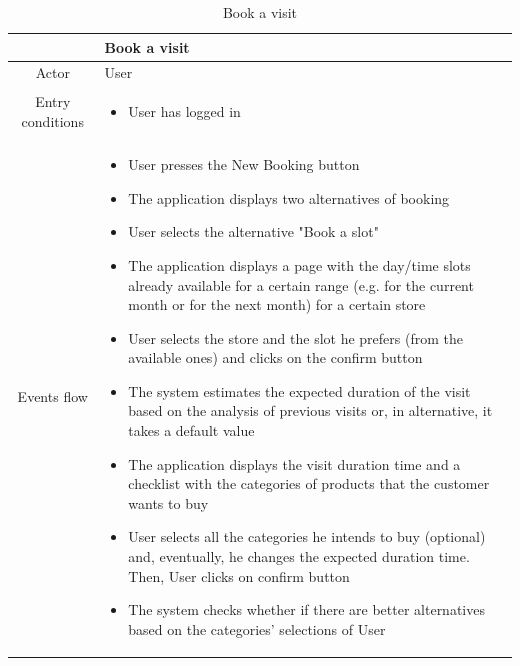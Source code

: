 \documentclass[table, 12pt]{article}
\begin{document}
\begin{longtable}{|c| p{10cm}|}
    \caption{Book a visit}                                                                                                                                          \\
    \hline
                     & Book a visit                                                                                                                                 \\
    \hline
    Actor            & User                                                                                                                                         \\
    \hline
    Entry conditions & \begin{itemize}
        \item User has logged in
    \end{itemize}                                                                                                                   \\
    \hline
    Events flow      & \begin{itemize}[nosep,after=\strut]
        \item User presses the New Booking button
        \item The application displays two alternatives of booking
        \item User selects the alternative "Book a slot"
        \item The application displays a page with the day/time slots already available for a certain range (e.g. for the current month or for the next month) for a certain store
        \item User selects the store and the slot he prefers (from the available ones) and clicks on the confirm button
        \item The system estimates the expected duration of the visit based on the analysis of previous visits or, in alternative, it takes a default value
        \item The application displays the visit duration time and a checklist with the categories of products that the customer wants to buy
        \item User selects all the categories he intends to buy (optional) and, eventually, he changes the expected duration time. Then, User clicks on confirm button
        \item The system checks whether if there are better alternatives based on the categories' selections of User

\end{itemize}
\end{longtable}
\end{document}
